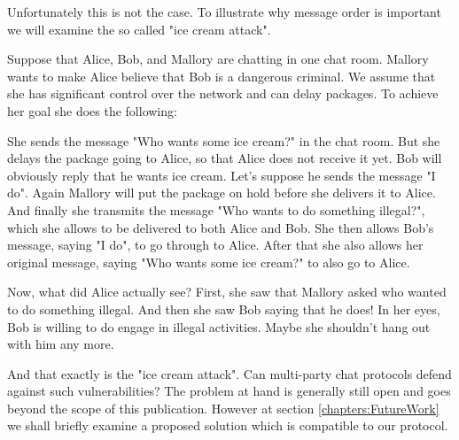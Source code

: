Unfortunately this is not the case.
To illustrate why message order is important we will examine the so called "ice cream attack".

Suppose that Alice, Bob, and Mallory are chatting in one chat room.
Mallory wants to make Alice believe that Bob is a dangerous criminal.
We assume that she has significant control over the network and can delay packages.
To achieve her goal she does the following:

She sends the message "Who wants some ice cream?" in the chat room.
But she delays the package going to Alice, so that Alice does not receive it yet.
Bob will obviously reply that he wants ice cream.
Let's suppose he sends the message "I do".
Again Mallory will put the package on hold before she delivers it to Alice.
And finally she transmits the message "Who wants to do something illegal?", which she allows to be delivered to both Alice and Bob.
She then allows Bob's message, saying "I do", to go through to Alice.
After that she also allows her original message, saying "Who wants some ice cream?" to also go to Alice.

Now, what did Alice actually see?
First, she saw that Mallory asked who wanted to do something illegal.
And then she saw Bob saying that he does!
In her eyes, Bob is willing to do engage in illegal activities.
Maybe she shouldn't hang out with him any more.

And that exactly is the "ice cream attack".
Can multi-party chat protocols defend against such vulnerabilities?
The problem at hand is generally still open and goes beyond the scope of this publication.
However at section \ref{chapters:FutureWork} we shall briefly examine a proposed solution which is compatible to our protocol.

